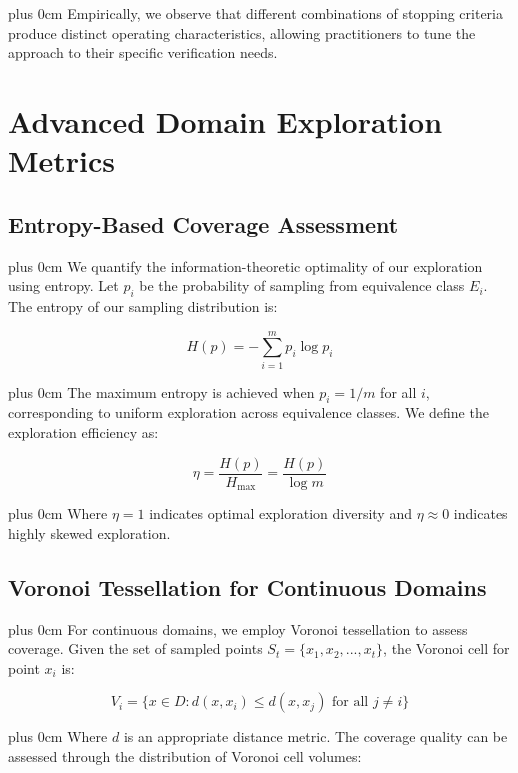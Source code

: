 \documentclass[conference]{IEEEtran}
\newcommand{\justifytext}{\leftskip=0pt \rightskip=0pt plus 0cm}
\begin{document}
\justifytext
Empirically, we observe that different combinations of stopping criteria produce distinct operating characteristics, allowing practitioners to tune the approach to their specific verification needs.

\section{Advanced Domain Exploration Metrics}

\subsection{Entropy-Based Coverage Assessment}

\justifytext
We quantify the information-theoretic optimality of our exploration using entropy. Let $p_i$ be the probability of sampling from equivalence class $E_i$. The entropy of our sampling distribution is:

\begin{equation}
H(p) = -\sum_{i=1}^{m} p_i \log p_i
\end{equation}

\justifytext
The maximum entropy is achieved when $p_i = 1/m$ for all $i$, corresponding to uniform exploration across equivalence classes. We define the exploration efficiency as:

\begin{equation}
\eta = \frac{H(p)}{H_{\max}} = \frac{H(p)}{\log m}
\end{equation}

\justifytext
Where $\eta = 1$ indicates optimal exploration diversity and $\eta \approx 0$ indicates highly skewed exploration.

\subsection{Voronoi Tessellation for Continuous Domains}

\justifytext
For continuous domains, we employ Voronoi tessellation to assess coverage. Given the set of sampled points $S_t = \{x_1, x_2, ..., x_t\}$, the Voronoi cell for point $x_i$ is:

\begin{equation}
V_i = \{x \in D : d(x, x_i) \leq d(x, x_j) \text{ for all } j \neq i\}
\end{equation}

\justifytext
Where $d$ is an appropriate distance metric. The coverage quality can be assessed through the distribution of Voronoi cell volumes:
\end{document}
